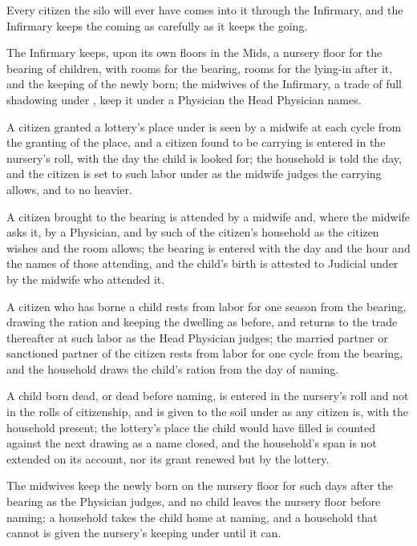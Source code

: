 Every citizen the silo will ever have comes into it through the Infirmary, and the Infirmary keeps the coming as carefully as it keeps the going.

\begin{clauses}
\item The Infirmary keeps, upon its own floors in the Mids, a nursery floor for the bearing of children, with rooms for the bearing, rooms for the lying-in after it, and the keeping of the newly born; the midwives of the Infirmary, a trade of full shadowing under , keep it under a Physician the Head Physician names.
\item A citizen granted a lottery's place under  is seen by a midwife at each cycle from the granting of the place, and a citizen found to be carrying is entered in the nursery's roll, with the day the child is looked for; the household is told the day, and the citizen is set to such labor under  as the midwife judges the carrying allows, and to no heavier.
\item A citizen brought to the bearing is attended by a midwife and, where the midwife asks it, by a Physician, and by such of the citizen's household as the citizen wishes and the room allows; the bearing is entered with the day and the hour and the names of those attending, and the child's birth is attested to Judicial under  by the midwife who attended it.
\item A citizen who has borne a child rests from labor for one season from the bearing, drawing the ration and keeping the dwelling as before, and returns to the trade thereafter at such labor as the Head Physician judges; the married partner or sanctioned partner of the citizen rests from labor for one cycle from the bearing, and the household draws the child's ration from the day of naming.
\item A child born dead, or dead before naming, is entered in the nursery's roll and not in the rolls of citizenship, and is given to the soil under  as any citizen is, with the household present; the lottery's place the child would have filled is counted against the next drawing as a name closed, and the household's span is not extended on its account, nor its grant renewed but by the lottery.
\item The midwives keep the newly born on the nursery floor for such days after the bearing as the Physician judges, and no child leaves the nursery floor before naming; a household takes the child home at naming, and a household that cannot is given the nursery's keeping under  until it can.
\end{clauses}

